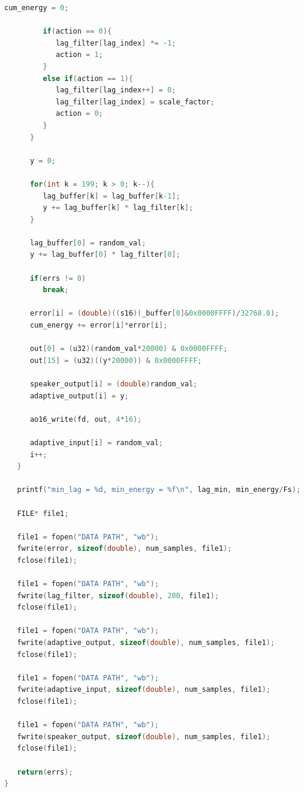 \begin{lstlisting}[language=C]
         cum_energy = 0;

         if(action == 0){
            lag_filter[lag_index] *= -1;
            action = 1;
         }
         else if(action == 1){
            lag_filter[lag_index++] = 0;
            lag_filter[lag_index] = scale_factor;
            action = 0;
         }
      }

      y = 0;

      for(int k = 199; k > 0; k--){
         lag_buffer[k] = lag_buffer[k-1];
         y += lag_buffer[k] * lag_filter[k];
      }

      lag_buffer[0] = random_val;
      y += lag_buffer[0] * lag_filter[0];

      if(errs != 0)
         break;

      error[i] = (double)((s16)(_buffer[0]&0x0000FFFF)/32768.0);
      cum_energy += error[i]*error[i];

      out[0] = (u32)(random_val*20000) & 0x0000FFFF;
      out[15] = (u32)((y*20000)) & 0x0000FFFF;

      speaker_output[i] = (double)random_val;
      adaptive_output[i] = y;

      ao16_write(fd, out, 4*16);

      adaptive_input[i] = random_val;
      i++;
   }

   printf("min_lag = %d, min_energy = %f\n", lag_min, min_energy/Fs);

   FILE* file1;

   file1 = fopen("DATA PATH", "wb");
   fwrite(error, sizeof(double), num_samples, file1);
   fclose(file1);

   file1 = fopen("DATA PATH", "wb");
   fwrite(lag_filter, sizeof(double), 200, file1);
   fclose(file1);

   file1 = fopen("DATA PATH", "wb");
   fwrite(adaptive_output, sizeof(double), num_samples, file1);
   fclose(file1);

   file1 = fopen("DATA PATH", "wb");
   fwrite(adaptive_input, sizeof(double), num_samples, file1);
   fclose(file1);

   file1 = fopen("DATA PATH", "wb");
   fwrite(speaker_output, sizeof(double), num_samples, file1);
   fclose(file1);

   return(errs);
}
\end{lstlisting}
